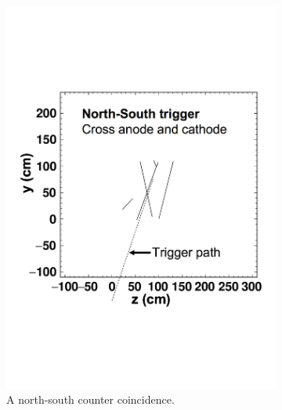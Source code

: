 \begin{figure}
  \centering
  \begin{subfigure}{0.48\textwidth}
    \centering
    \includegraphics[width=\textwidth]{north-south}
    \caption{A north-south counter coincidence.}
    \label{fig:CounterTrackAngle_NS}
  \end{subfigure}%
  \hspace{0.03\textwidth}%
  \begin{subfigure}{0.48\textwidth}
    \centering

\end{subfigure}
\end{figure}
